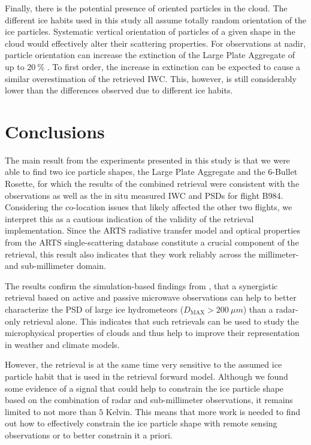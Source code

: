 \documentclass[journal abbreviation, manuscript]{copernicus}
\begin{document}
Finally, there is the potential presence of oriented particles in the cloud. The
different ice habits used in this study all assume totally random orientation of
the ice particles. Systematic vertical orientation of particles of a given shape
in the cloud would effectively alter their scattering properties. For
observations at nadir, particle orientation can increase the extinction of the
Large Plate Aggregate of up to $20\ \unit{\%}$ \citep{barlakas21}. To first
order, the increase in extinction can be expected to cause a similar
overestimation of the retrieved IWC. This, however, is still considerably lower
than the differences observed due to different ice habits.

\section{Conclusions}
\label{sec:conclusions}

The main result from the experiments presented in this study is that we were
able to find two ice particle shapes, the Large Plate Aggregate and the 6-Bullet
Rosette, for which the results of the combined retrieval were consistent with
the observations as well as the in situ measured IWC and PSDs for flight B984.
Considering the co-location issues that likely affected the other two flights,
we interpret this as a cautious indication of the validity of the retrieval
implementation. Since the ARTS radiative transfer model and optical properties
from the ARTS single-scattering database constitute a crucial component of the
retrieval, this result also indicates that they work reliably across the
millimeter- and sub-millimeter domain.

The results confirm the simulation-based findings from \citep{pfreundschuh20},
that a synergistic retrieval based on active and passive microwave observations
can help to better characterize the PSD of large ice hydrometeors ($D_\text{MAX}
> 200\ \unit{\mu m}$) than a radar-only retrieval alone. This indicates that
such retrievals can be used to study the microphysical properties of clouds and
thus help to improve their representation in weather and climate models.

However, the retrieval is at the same time very sensitive to the assumed ice
particle habit that is used in the retrieval forward model. Although we found
some evidence of a signal that could help to constrain the ice particle shape
based on the combination of radar and sub-millimeter observations, it remains
limited to not more than $5$ Kelvin. This means that more work is needed
to find out how to effectively constrain the ice particle shape with
remote sensing observations or to better constrain it a priori.
\end{document}
